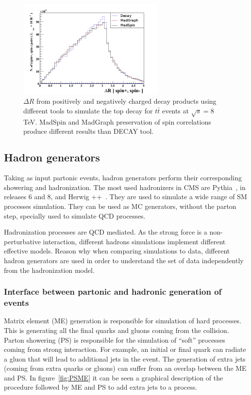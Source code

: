 \begin{figure}[!Hhtbp]
  \begin{center}
    \includegraphics[width=0.65\textwidth]{figs/TT_MadSPin_2.png}
    \caption{$\Delta R$ from positively and negatively charged decay products using different tools to simulate the top decay for $t\bar{t}$ events at $\sqrt{s}=8$ TeV. MadSpin and MadGraph preservation of spin correlations produce different results than DECAY tool.}
    \label{fig:MS2}
  \end{center}
\end{figure}

\subsection{Hadron generators}
\label{sec:Had}

Taking as input partonic events, hadron generators perform their corresponding showering and hadronization. The most used hadronizers in CMS are Pythia~\cite{Sjostrand:2006za}, in releases 6 and 8, and Herwig ++~\cite{Bahr:2008pv}. They are used to simulate a wide range of SM processes simulation. They can be used as MC generators, without the parton step, specially used to simulate QCD processes.

Hadronization processes are QCD mediated. As the strong force is a non-perturbative interaction, different hadrons simulations implement different effective models. Reason why when comparing simulations to data, different hadron generators are used in order to understand the set of data independently from the hadronization model. 

\subsubsection{Interface between partonic and hadronic generation of events}
\label{sec:Merging}

Matrix element (ME) generation is responsible for simulation of hard processes. This is generating all the final quarks and gluons coming from the collision. Parton showering (PS) is responsible for the simulation of ``soft'' processes coming from strong interaction. For example, an initial or final quark can radiate a gluon that will lead to additional jets in the event. The generation of extra jets (coming from extra quarks or gluons) can suffer from an overlap between the ME and PS. In figure~\ref{fig:PSME} it can be seen a graphical description of the procedure followed by ME and PS to add extra jets to a process. 

